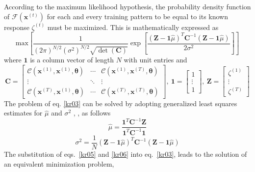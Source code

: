 \documentclass{vki_ls}
\newcommand{\vect}[1]{\bm{#1}}
\newcommand{\set}[1]{\mathcal{#1}}
\newcommand{\CBF}{\mathbf{C}}
\newcommand{\onebf}{\mathbf{1}}
\begin{document}
According to the maximum likelihood hypothesis, the probability density function of $\set{F}(\vect x^{(t)})$ for each and every training pattern to be equal to its known response $\zeta^{(t)}$ must be maximized. This is mathematically expressed as
%
\begin{equation}
   \mbox{max} 
   \left[ \frac{1}{(2\pi)^{N/2} (\sigma^2)^{N/2} \sqrt{\det(\CBF)}} 
	  \exp \left[ \frac{(\vect{Z} - \onebf \hat{\mu})^T 
                            \CBF^{-1} (\vect{Z} - \onebf \hat{\mu})}
                           {2 \sigma^2} \right]
   \right]
   \label{kr03}
\end{equation}
%
where $\onebf$ is a column vector of length $N$ with unit entries and
%
\begin{equation}
   \CBF = 
   \left[
	\begin{array}{ccc}
	\set{C} \left(\vect{x}^{(1)}, \vect{x}^{(1)},\vect{\theta} \right)
	 &\cdots &
	\set{C} \left(\vect{x}^{(1)}, \vect{x}^{(T)},\vect{\theta} \right)\\
	\vdots& \ddots &\vdots\\
	\set{C} \left(\vect{x}^{(T)}, \vect{x}^{(1)},\vect{\theta} \right)
	&\cdots &
	\set{C} \left(\vect{x}^{(T)}, \vect{x}^{(T)},\vect{\theta} \right)
	\end{array}
   \right],\ 
   \onebf = 
   \left[
	\begin{array}{c}
	1\\
	\vdots\\
	1
	\end{array}
   \right],\
   \vect{Z} = 
   \left[
	\begin{array}{c}
	\zeta^{(1)}\\
	\vdots\\
	\zeta^{(T)}
	\end{array}
   \right]
   \label{kr04}
\end{equation}
%
The problem of eq. \ref{kr03} can be solved by adopting generalized least squares estimates for $\hat{\mu}$ and $\sigma^2$ , \cite{Koe96}, as follows
%
\begin{equation}
   \hat{\mu} = \frac {\onebf^T \CBF^{-1} \vect{Z}} 
		     {\onebf^T \CBF^{-1} \onebf}
   \label{kr05}
\end{equation}
%
\begin{equation}
   \sigma^2 = \frac {1}{N}(\vect{Z} - \onebf \hat{\mu})^T
   \CBF^{-1} (\vect{Z} - \onebf \hat{\mu})
   \label{kr06}
\end{equation}
%
The substitution of eqs.~\ref{kr05} and \ref{kr06} into eq.~\ref{kr03}, leads to the solution of an equivalent minimization problem,
\end{document}
